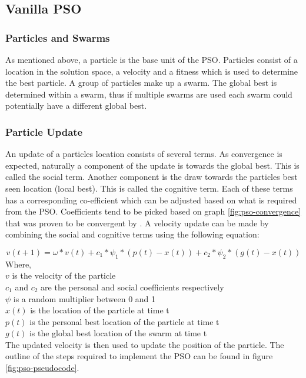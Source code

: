 \subsection{Vanilla PSO}
\subsubsection{Particles and Swarms}
As mentioned above, a particle is the base unit of the PSO. Particles consist of a location in the solution space, a velocity and a fitness which is used to determine the best particle. A group of particles make up a swarm. The global best is determined within a swarm, thus if multiple swarms are used each swarm could potentially have a different global best.
	
\subsubsection{ Particle Update}
	An update of a particles location consists of several terms. As convergence is expected, naturally a component of the update is towards the global best. This is called the social term. Another component is the draw towards the particles best seen location (local best). This is called the cognitive term. Each of these terms has a corresponding co-efficient which can be adjusted based on what is required from the PSO. Coefficients tend to be picked based on graph \ref{fig:pso-convergence} that was proven to be convergent by \cite{englebrecht-pso}. A velocity update can be made by combining the social and cognitive terms using the following equation:
	
\[ v(t+1) = \omega * v(t) + c_1*\psi_1 * (p(t) - x(t)) + c_2*\psi_2 * (g(t) - x(t)) \] Where,\\
\indent $v$ is the velocity of the particle\\
\indent $c_1$ and $c_2$ are the personal and social coefficients respectively\\
\indent $\psi$ is a random multiplier between 0 and 1\\
\indent $x(t)$ is the location of the particle at time t\\
\indent $p(t)$ is the personal best location of the particle at time t\\
\indent $g(t)$ is the global best location of the swarm at time t\\
	
The updated velocity is then used to update the position of the particle. The outline of the steps required to implement the PSO can be found in figure \ref{fig:pso-pseudocode}.


